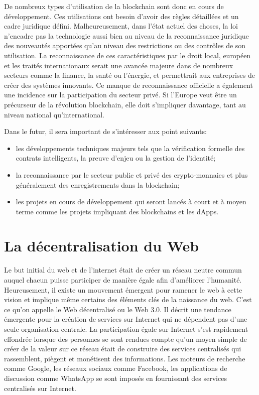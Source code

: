 \documentclass{tnreport}
\begin{document}
De nombreux types d'utilisation de la blockchain sont donc en cours de développement.
Ces utilisations ont besoin d'avoir des règles détaillées et un cadre juridique défini. Malheureusement, dans l'état actuel des choses, la loi n'encadre pas la technologie aussi bien au niveau de la reconnaissance juridique des nouveautés apportées qu'au niveau des restrictions ou des contrôles de son utilisation.
La reconnaissance de ces caractéristiques par le droit local, européen et les traités internationaux serait une avancée majeure dans de nombreux secteurs comme la finance, la santé ou l'énergie, et permettrait aux entreprises de créer des systèmes innovants.
Ce manque de reconnaissance officielle a également une incidence sur la participation du secteur privé.
Si l'Europe veut être un précurseur de la révolution blockchain, elle doit s'impliquer davantage, tant au niveau national qu'international.

Dans le futur, il sera important de s'intéresser aux point suivants:
\begin{itemize}
	\item les développements techniques majeurs tels que la vérification formelle des contrats intelligents, la preuve d'enjeu ou la gestion de l'identité;
	\item la reconnaissance par le secteur public et privé des crypto-monnaies et plus généralement des enregistrements dans la blockchain;
	\item les projets en cours de développement qui seront lancés à court et à moyen terme comme les projets impliquant des blockchains et les dApps.
\end{itemize}

\section{La décentralisation du Web}

Le but initial du web et de l'internet était de créer un réseau neutre commun auquel chacun puisse participer de manière égale afin d'améliorer l'humanité. Heureusement, il existe un mouvement émergent pour ramener le web à cette vision et implique même certains des éléments clés de la naissance du web. C'est ce qu'on appelle le Web décentralisé ou le Web 3.0. Il décrit une tendance émergente pour la création de services sur Internet qui ne dépendent pas d'une seule organisation centrale.
La participation égale sur Internet s'est rapidement effondrée lorsque des personnes se sont rendues compte qu'un moyen simple de créer de la valeur sur ce réseau était de construire des services centralisés qui rassemblent, piègent et monétisent des informations.
Les moteurs de recherche comme Google, les réseaux sociaux comme Facebook, les applications de discussion comme WhatsApp se sont imposés en fournissant des services centralisés sur Internet.
\end{document}
